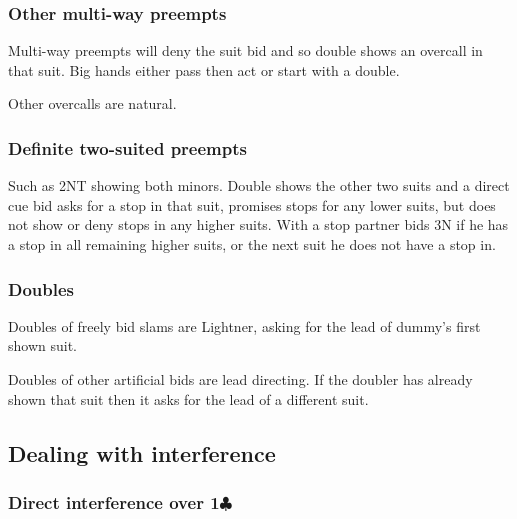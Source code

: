 \documentclass[a4paper,14pt]{extarticle}
\begin{document}
\subsubsection{Other multi-way preempts}

Multi-way preempts will deny the suit bid and so double shows an overcall in
that suit. Big hands either pass then act or start with a double.

Other overcalls are natural.

\subsubsection{Definite two-suited preempts}

Such as 2NT showing both minors. Double shows the other two suits and a direct
cue bid asks for a stop in that suit, promises stops for any lower suits, but
does not show or deny stops in any higher suits. With a stop partner bids 3N if
he has a stop in all remaining higher suits, or the next suit he does not have
a stop in.

\subsubsection{Doubles}
\label{sec:def:doubles}

Doubles of freely bid slams are Lightner, asking for the lead of dummy's first shown suit.

Doubles of other artificial bids are lead directing. If the doubler has already shown that
suit then it asks for the lead of a different suit.

\newpage

\subsection{Dealing with interference}
\label{sec:interference}

\subsubsection{Direct interference over 1$\clubsuit$}
\label{sec:intf:1c}
\end{document}
